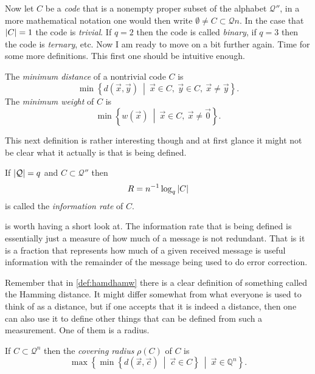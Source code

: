 Now let $C$ be a \emph{code} that is a nonempty proper subset of the alphabet $\mathcal{Q}''$, in a more mathematical notation one would then write $\emptyset \neq C \subset \mathcal{Q}n$. In the case that $\left\vert C \right\vert = 1$ the code is \emph{trivial}. If $q = 2$ then the code is called \emph{binary}, if $q = 3$ then the code is \emph{ternary}, etc. Now I am ready to move on a bit further again. Time for some more definitions. This first one should be intuitive enough.

\begin{defi}
\label{def:minDistminW}
	The \emph{minimum distance} of a nontrivial code $C$ is
	\[
		\min \left\{ d\left(\vec{x}, \vec{y}\right) \ \middle\vert \ \vec{x} \in C, \ \vec{y} \in C, \ \vec{x} \neq \vec{y} \right\}.
	\]
	The \emph{minimum weight} of $C$ is
	\begin{equation*}
		\min \left\{ w\left(\vec{x}\right) \ \middle\vert \ \vec{x} \in C, \ \vec{x} \neq \vec{0} \right\}.
	\end{equation*}
\end{defi}

This next definition is rather interesting though and at first glance it might not be clear what it actually is that is being defined.
\begin{defi}
\label{def:infRate}
	If $\left\vert \mathcal{Q} \right\vert = q$ and $C \subset \mathcal{Q}''$ then
	\[
		R = n^{-1} \log_{q} \left\vert C \right\vert
	\]
	is called the \emph{information rate} of $C$.
\end{defi}
 is worth having a short look at. The information rate that is being defined is essentially just a measure of how much of a message is not redundant. That is it is a fraction that represents how much of a given received message is useful information with the remainder of the message being used to do error correction.

Remember that in \cref{def:hamdhamw} there is a clear definition of something called the Hamming distance. It might differ somewhat from what everyone is used to think of as a distance, but if one accepts that it is indeed a distance, then one can also use it to define other things that can be defined from such a measurement. One of them is a radius.
\begin{defi}
\label{def:covRad}
	If $C \subset \mathcal{Q}^n$ then the \emph{covering radius} $\rho \left(C\right)$ of $C$ is
	\begin{equation*}
		\max \left\{ \min \left\{ d\left(\vec{x},\vec{c}\right) \ \middle\vert \ \vec{c} \in C \right\} \ \middle\vert \ \vec{x} \in \mathbb{Q}^n \right\}.
	\end{equation*}
\end{defi}

